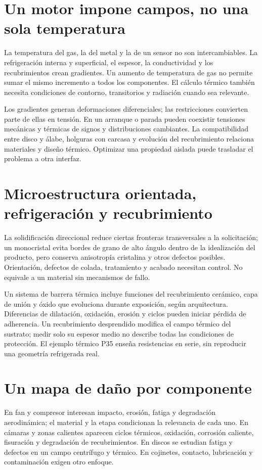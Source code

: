 
\section{Un motor impone campos, no una sola temperatura}
La temperatura del gas, la del metal y la de un sensor no son intercambiables. La refrigeración interna y superficial, el espesor, la conductividad y los recubrimientos crean gradientes. Un aumento de temperatura de gas no permite sumar el mismo incremento a todos los componentes. El cálculo térmico también necesita condiciones de contorno, transitorios y radiación cuando sea relevante.

Los gradientes generan deformaciones diferenciales; las restricciones convierten parte de ellas en tensión. En un arranque o parada pueden coexistir tensiones mecánicas y térmicas de signos y distribuciones cambiantes. La compatibilidad entre disco y álabe, holguras con carcasa y evolución del recubrimiento relaciona materiales y diseño térmico. Optimizar una propiedad aislada puede trasladar el problema a otra interfaz.
\section{Microestructura orientada, refrigeración y recubrimiento}
La solidificación direccional reduce ciertas fronteras transversales a la solicitación; un monocristal evita bordes de grano de alto ángulo dentro de la idealización del producto, pero conserva anisotropía cristalina y otros defectos posibles. Orientación, defectos de colada, tratamiento y acabado necesitan control. No equivale a un material sin mecanismos de fallo.

Un sistema de barrera térmica incluye funciones del recubrimiento cerámico, capa de unión y óxido que evoluciona durante exposición, según arquitectura. Diferencias de dilatación, oxidación, erosión y ciclos pueden iniciar pérdida de adherencia. Un recubrimiento desprendido modifica el campo térmico del sustrato; medir solo su espesor medio no describe todas las condiciones de protección. El ejemplo térmico P35 enseña resistencias en serie, sin reproducir una geometría refrigerada real.
\section{Un mapa de daño por componente}
En fan y compresor interesan impacto, erosión, fatiga y degradación aerodinámica; el material y la etapa condicionan la relevancia de cada uno. En cámaras y zonas calientes aparecen ciclos térmicos, oxidación, corrosión caliente, fisuración y degradación de recubrimientos. En discos se estudian fatiga y defectos en un campo centrífugo y térmico. En cojinetes, contacto, lubricación y contaminación exigen otro enfoque.

